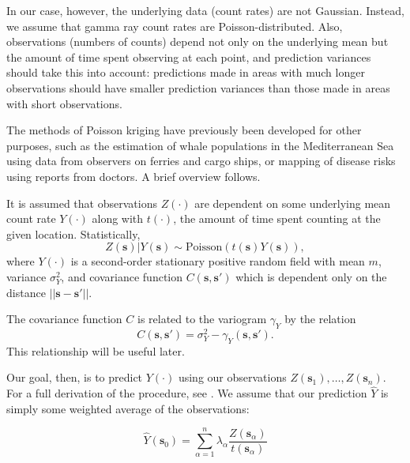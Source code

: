 In our case, however, the underlying data (count rates) are not
Gaussian. Instead, we assume that gamma ray count rates are
Poisson-distributed. Also, observations (numbers of counts) depend not only on
the underlying mean but the amount of time spent observing at each point, and
prediction variances should take this into account: predictions made in areas
with much longer observations should have smaller prediction variances than
those made in areas with short observations.

The methods of Poisson kriging have previously been developed for other
purposes, such as the estimation of whale populations in the Mediterranean Sea
using data from observers on ferries and cargo ships,\cite{Monestiez:2006jp} or
mapping of disease risks using reports from doctors.\cite{Goovaerts:2008dj} A
brief overview follows.

It is assumed that observations \(Z(\cdot)\) are dependent on some underlying
mean count rate \(Y(\cdot)\) along with \(t(\cdot)\), the amount of time spent
counting at the given location. Statistically,
\begin{equation}
  Z(\mathbf{s}) | Y(\mathbf{s}) \sim \text{Poisson}(t(\mathbf{s}) Y(\mathbf{s})),
\end{equation}
where \(Y(\cdot)\) is a second-order stationary positive random field with mean
\(m\), variance \(\sigma_Y^2\), and covariance function \(C(\mathbf{s},
\mathbf{s'})\) which is dependent only on the distance \(||\mathbf{s} -
\mathbf{s'}||\).

The covariance function \(C\) is related to the variogram \(\gamma_Y\) by the
relation 
\begin{equation}\label{var-covar}
  C(\mathbf{s}, \mathbf{s'}) = \sigma_Y^2 - \gamma_Y (\mathbf{s},
  \mathbf{s'}).
\end{equation}
This relationship will be useful later.

Our goal, then, is to predict \(Y(\cdot)\) using our observations
\(Z(\mathbf{s}_1),\ldots,Z(\mathbf{s}_n)\). For a full derivation of the
procedure, see \cite{Monestiez:2006jp}. We assume that our prediction \(\hat Y\)
is simply some weighted average of the observations:

\begin{equation}
  \hat{Y}(\mathbf{s}_0) = \sum_{\alpha=1}^n \lambda_\alpha
  \frac{Z(\mathbf{s}_\alpha)}{t(\mathbf{s}_\alpha)}
\end{equation}

